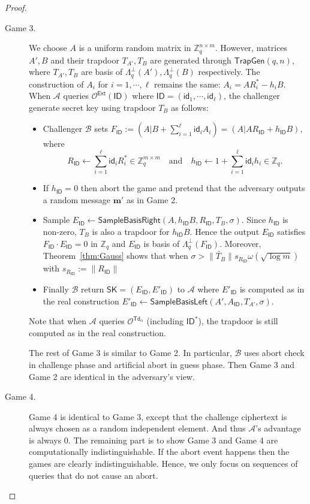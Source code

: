\documentclass[runningheads,10pt]{llncs}
\def\ZZ{\mathbb{Z}}
\def\cal{\mathcal}
\def\bf{\mathbf}
\def\TrapGen{\mathsf{TrapGen}}
\def\SK{\mathsf{SK}}
\def\SampleBasisLeft{\mathsf{SampleBasisLeft}}
\def\SampleBasisRight{\mathsf{SampleBasisRight}}
\def\Ext{\mathsf{Ext}}
\def\Td{\mathsf{Td}}
\def\Lp{\Lambda^{\perp}}
\def\ID{\mathsf{ID}}
\def\id{\mathsf{id}}
\begin{document}
\begin{proof}
\begin{description}
		\item[Game 3.] We choose $A$ is a uniform random matrix in $\ZZ_q^{n\times m}$. However, matrices $A', B$ and their trapdoor $T_{A'}, T_B$ are generated through $\TrapGen(q,n)$, where $T_{A'}, T_B$ are basis of $\Lp_q(A'), \Lp_q(B)$ respectively. The construction of $A_i$ for $i=1,\cdots,\ell$ remains the same: $A_i=AR_i^*-h_iB$. When $\cal{A}$ queries $\cal{O}^{\Ext}(\ID)$ where $\ID=(\id_1,\cdots,\id_\ell)$, the challenger generate secret key using trapdoor $T_B$ as follows:
		\begin{itemize}
			\item Challenger $\cal{B}$ sets
			$F_\ID:=(A|B+\sum_{i=1}^\ell \id_iA_i) = (A|AR_{\ID} + h_{\ID} B),$
			where
			\begin{equation}\label{eq:R and h}
			R_\ID\gets\sum_{i=1}^\ell \id_iR_i^*\in\ZZ_q^{m\times m}\quad\text{and}\quad h_\ID\gets 1+\sum_{i=1}^\ell \id_ih_i\in\ZZ_q.
			\end{equation}
			\item If $h_\ID=0$ then abort the game and pretend that the adversary outputs a random message $\bf{m}'$ as in Game 2.
			\item Sample 
			$E_\ID\gets\SampleBasisRight(A,h_\ID B,R_\ID,T_B,\sigma).$
			Since $h_\ID$ is non-zero, $T_B$ is also a trapdoor for $h_{\ID} B$. Hence the output $E_\ID$ satisfies $F_\ID\cdot E_{\ID} = 0$ in $\ZZ_q$ and $E_{\ID}$ is basis of $\Lambda_q^\perp(F_\ID)$. Moreover, Theorem~\ref{thm:Gauss} shows that when $\sigma>\|\widetilde{T_B}\|s_{R_\ID}\omega(\sqrt{\log m})$ with $s_{R_\ID}:=\|R_\ID\|$
			\item Finally $\cal{B}$ return $\SK=(E_\ID, E'_\ID)$ to $\cal{A}$ where $E'_\ID$ is computed as in the real construction
			$E'_{\ID}\gets\SampleBasisLeft(A',A_{\ID},T_{A'},\sigma).$
		\end{itemize}
		Note that when $\cal{A}$ queries $\cal{O}^{\Td_\alpha}$ (including $\ID^*$), the trapdoor is still computed as in the real construction.
		
		The rest of Game 3 is similar to Game 2. In particular, $\cal{B}$ uses abort check in challenge phase and artificial abort in guess phase. Then Game 3 and Game 2 are identical in the adversary's view.\\
		
		\item[Game 4.] Game 4 is identical to Game 3, except that the challenge ciphertext is always chosen as a random independent element. And thus $\cal{A}$'s advantage is always $0$. The remaining part is to show Game 3 and Game 4 are computationally indistinguishable. If the abort event happens then the games are clearly indistinguishable. Hence, we only focus on sequences of queries that do not cause an abort.\\
		

\end{description}
\end{proof}
\end{document}
